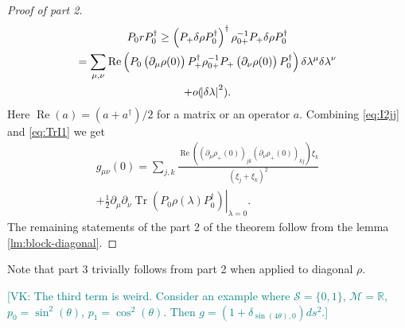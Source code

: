 \documentclass[american,aps,pra,reprint,floatfix,nofootinbib,superscriptaddress]{revtex4-2}
\DeclareMathOperator{\Tr}{Tr}
\DeclareMathOperator{\real}{Re}
\newcommand{\VK}[1]{\textcolor{teal}{[VK: #1]}}
\begin{document}
\begin{proof}[Proof of part 2]
  \begin{multline}
    P_0 r P_0^{\dagger}
    \geq \left(P_{+} \delta\rho P_0^{\dagger}\right)^{\dagger}
    \rho_{0{+}}^{-1} P_{+} \delta\rho P_0^{\dagger} \\
    = \sum_{\mu,\nu} \real\left(
        P_0 \left(\partial_\mu\rho(0)\right)
        P_{+}^{\dagger} \rho_{0{+}}^{-1}
        P_{+} \left(\partial_\nu\rho(0)\right) P_0^{\dagger}
      \right)
      \delta\lambda^\mu \delta\lambda^\nu \\
    + o(\abs{\delta \lambda}^2).
  \end{multline}
  Here $\real(a) = (a + a^{\dagger}) / 2$ for a matrix or an operator $a$.
  Combining \eqref{eq:I2jj} and \eqref{eq:TrI1} we get
  \begin{multline}
    g_{\mu\nu}(0)
    = \sum_{j,k} \frac{
        \real\left(
          (\partial_\mu\rho_{+}(0))_{jk}
          (\partial_\nu\rho_{+}(0))_{kj}
        \right) \xi_k
      }{(\xi_j + \xi_k)^2}\\
    + \frac12 \left.\partial_\mu \partial_\nu \Tr(P_0 \rho(\lambda)
    P_0^{\dagger}) \right|_{\lambda=0}.
  \end{multline}
  The remaining statements of the part 2 of the theorem follow from the
  lemma \ref{lm:block-diagonal}.
\end{proof}
Note that part 3 trivially follows from part 2 when applied to diagonal $\rho$.

\VK{The third term is weird.
Consider an example where $\mathcal{S} = \{0, 1\}$, $\mathcal{M} = \mathbb{R}$,
$p_0 = \sin^2(\theta)$, $p_1 = \cos^2(\theta)$. Then $g = (1 + \delta_{\sin(4\theta),0}) ds^2$.}
\end{document}

